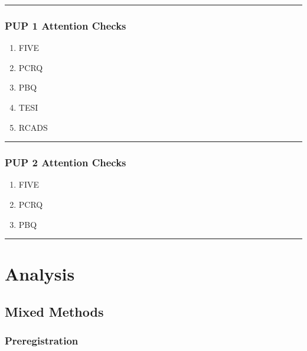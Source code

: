 \documentclass[]{book}
\providecommand{\tightlist}{%
  \setlength{\itemsep}{0pt}\setlength{\parskip}{0pt}}
\begin{document}
\begin{center}\rule{0.5\linewidth}{0.5pt}\end{center}

\hypertarget{pup-1-attention-checks}{%
\subsection{PUP 1 Attention Checks}\label{pup-1-attention-checks}}

\begin{enumerate}
\def\labelenumi{\arabic{enumi}.}
\tightlist
\item
  FIVE
\item
  PCRQ
\item
  PBQ
\item
  TESI
\item
  RCADS
\end{enumerate}

\begin{center}\rule{0.5\linewidth}{0.5pt}\end{center}

\hypertarget{pup-2-attention-checks}{%
\subsection{PUP 2 Attention Checks}\label{pup-2-attention-checks}}

\begin{enumerate}
\def\labelenumi{\arabic{enumi}.}
\tightlist
\item
  FIVE
\item
  PCRQ
\item
  PBQ
\end{enumerate}

\begin{center}\rule{0.5\linewidth}{0.5pt}\end{center}

\hypertarget{analysis}{%
\chapter{Analysis}\label{analysis}}

\hypertarget{mixed-methods}{%
\section{Mixed Methods}\label{mixed-methods}}

\hypertarget{preregistration}{%
\subsection{Preregistration}\label{preregistration}}
\end{document}
